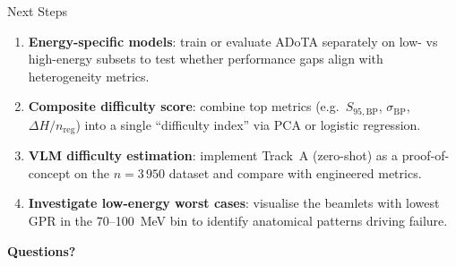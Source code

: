 \documentclass[aspectratio=169, 10pt]{beamer}
\begin{document}
\begin{frame}{Next Steps}
  \begin{enumerate}
    \item \textbf{Energy-specific models}: train or evaluate ADoTA
          separately on low- vs high-energy subsets to test whether
          performance gaps align with heterogeneity metrics.
    \item \textbf{Composite difficulty score}: combine top metrics
          (e.g.\ $S_{95,\text{BP}}$, $\sigma_{\text{BP}}$,
          $\Delta H / n_{\text{reg}}$) into a single ``difficulty index''
          via PCA or logistic regression.
    \item \textbf{VLM difficulty estimation}: implement Track~A
          (zero-shot) as a proof-of-concept on the $n{=}3\,950$
          dataset and compare with engineered metrics.
    \item \textbf{Investigate low-energy worst cases}: visualise the
          beamlets with lowest GPR in the 70--\SI{100}{MeV} bin to
          identify anatomical patterns driving failure.
  \end{enumerate}
\end{frame}

\begin{frame}[plain]
  \centering
  \vfill
  {\Large\bfseries\color{tudelft} Questions?}
  \vfill
\end{frame}
\end{document}
